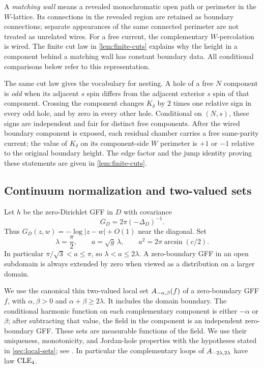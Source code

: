 A \emph{matching wall} means a revealed monochromatic open path or
perimeter in the \(W\)-lattice. Its connections in the revealed region
are retained as boundary connections; separate appearances of the same
connected perimeter are not treated as unrelated wires.
For a free current, the complementary \(W\)-percolation is wired.
The finite cut law in \cref{lem:finite-cuts} explains why the height in
a component behind a matching wall has constant boundary data.
All conditional comparisons below refer to this representation.

The same cut law gives the vocabulary for nesting. A hole of a free
\(N\) component is \emph{odd} when its adjacent \(s\) spin differs from
the adjacent exterior \(s\) spin of that component. Crossing the component
changes \(K_\delta\) by \(2\) times one relative sign in every odd hole,
and by zero in every other hole. Conditional on \((N,s)\), these signs
are independent and fair for distinct free components. After the wired
boundary component is exposed, each residual chamber carries a free
same-parity current; the value of \(K_\delta\) on its component-side
\(W\) perimeter is \(+1\) or \(-1\)
relative to the original boundary height. The edge factor and the jump
identity proving these statements are given in \cref{lem:finite-cuts}.

\subsection{Continuum normalization and two-valued sets}
Let \(h\) be the zero-Dirichlet GFF in \(D\) with covariance
\[
 G_D=2\pi(-\Delta_D)^{-1}.
\]
Thus \(G_D(z,w)=-\log|z-w|+O(1)\) near the diagonal. Set
\begin{equation}\label{eq:normalization}
 \lambda=\frac{\pi}{2},\qquad
 a=\sqrt g\,\lambda,\qquad
 a^2=2\pi\arcsin(c/2).
\end{equation}
In particular \(\pi/\sqrt3<a\leq\pi\), so
\(\lambda<a\leq2\lambda\). A zero-boundary GFF in an open subdomain is
always extended by zero when viewed as a distribution on a larger
domain.

We use the canonical thin two-valued local set
\(A_{-\alpha,\beta}(f)\) of a zero-boundary GFF \(f\), with
\(\alpha,\beta>0\) and \(\alpha+\beta\geq2\lambda\). It includes the domain boundary.
The conditional harmonic function on each complementary component is
either \(-\alpha\) or \(\beta\); after subtracting that value, the field in the
component is an independent zero-boundary GFF. These sets are measurable
functions of the field. We use their uniqueness, monotonicity, and
Jordan-hole properties with the hypotheses stated in
\cref{sec:local-sets}; see \cite{ASW2017,AS2018,ALS2017}.
In particular the complementary loops of
\(A_{-2\lambda,2\lambda}\) have law \(\mathrm{CLE}_4\).

